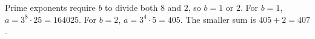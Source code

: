 Prime exponents require $b$ to divide both $8$ and $2$, so $b=1$ or $2$. For $b=1$, $a=3^8\cdot25=164025$. For $b=2$, $a=3^4\cdot5=405$. The smaller sum is $405+2=\boxed{407}$.
